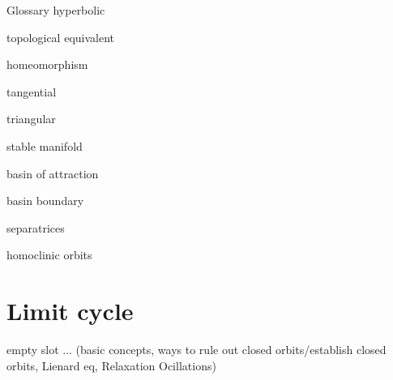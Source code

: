 \documentclass[9pt,aspectratio=43,mathserif,table]{beamer}
\begin{document}
\begin{frame}[label=current]{Glossary}
  hyperbolic

  topological equivalent

  homeomorphism

  tangential

  triangular

  stable manifold

  basin of attraction

  basin boundary

  separatrices

  homoclinic orbits
\end{frame}


\section{Limit cycle}
\begin{frame}[label=current]{empty slot}
 ... (basic concepts, ways to rule out closed orbits/establish closed orbits, Lienard eq, Relaxation Ocillations)
\end{frame}
\end{document}
